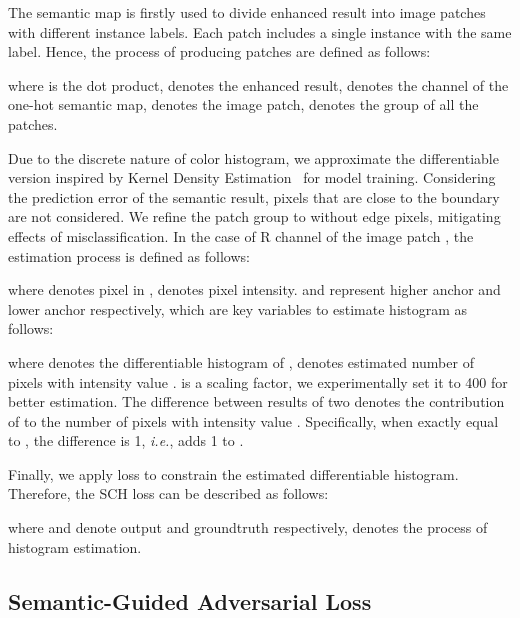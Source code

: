 \documentclass[10pt,twocolumn,letterpaper]{article}
\begin{document}
The semantic map is firstly used to divide enhanced result into image patches with different instance labels. Each patch includes a single instance with the same label. Hence, the process of producing patches are defined as follows:
\vspace{-0.1cm}

where  is the dot product,  denotes the enhanced result,  denotes the  channel of the one-hot semantic map,  denotes the  image patch,  denotes the group of all the patches. 

Due to the discrete nature of color histogram, we approximate the differentiable version inspired by Kernel Density Estimation~\cite{avi2020deephist} for model training. Considering the prediction error of the semantic result, pixels that are close to the boundary are not considered. We refine the patch group  to  without edge pixels, mitigating effects of misclassification. In the case of R channel of the  image patch , the estimation process is defined as follows:
\vspace{-0.1cm}

where  denotes  pixel in ,  denotes pixel intensity.  and  represent higher anchor and lower anchor respectively, which are key variables to estimate histogram as follows:
\vspace{-0.15cm}

\vspace{-0.6cm}

where  denotes the differentiable histogram of ,  denotes estimated number of pixels with intensity value .  is a scaling factor, we experimentally set it to 400 for better estimation. The difference between results of two  denotes the contribution of  to the number of pixels with intensity value . Specifically, when  exactly equal to , the difference is 1, \textit{i.e.},  adds 1 to .

Finally, we apply  loss to constrain the estimated differentiable histogram. Therefore, the SCH loss can be described as follows:
\vspace{-0.1cm}

where  and  denote output and groundtruth respectively,  denotes the process of histogram estimation.

\vspace{-0.1cm}
\subsection{Semantic-Guided Adversarial Loss}
\vspace{-0.1cm}
\label{subsec:saloss}
\end{document}
